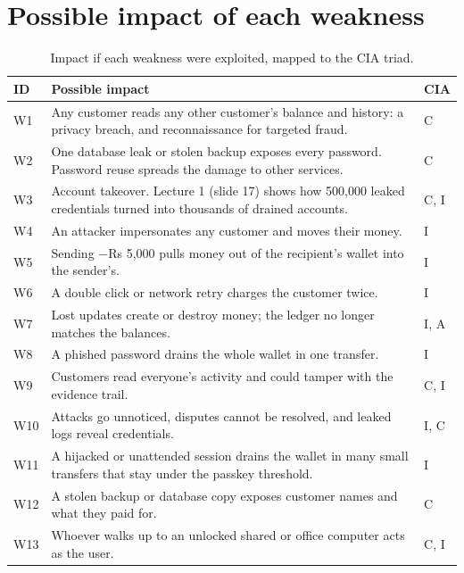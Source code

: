 \documentclass[11pt,a4paper]{article}
\begin{document}
\section{Possible impact of each weakness}

\begin{table}[H]
\centering\small
\caption{Impact if each weakness were exploited, mapped to the CIA triad.}
\begin{tabularx}{\textwidth}{lYl}
\toprule
ID & Possible impact & CIA \\
\midrule
W1 & Any customer reads any other customer's balance and history: a privacy breach, and reconnaissance for targeted fraud. & C \\
W2 & One database leak or stolen backup exposes every password. Password reuse spreads the damage to other services. & C \\
W3 & Account takeover. Lecture 1 (slide 17) shows how 500,000 leaked credentials turned into thousands of drained accounts. & C, I \\
W4 & An attacker impersonates any customer and moves their money. & I \\
W5 & Sending $-$Rs 5,000 pulls money out of the recipient's wallet into the sender's. & I \\
W6 & A double click or network retry charges the customer twice. & I \\
W7 & Lost updates create or destroy money; the ledger no longer matches the balances. & I, A \\
W8 & A phished password drains the whole wallet in one transfer. & I \\
W9 & Customers read everyone's activity and could tamper with the evidence trail. & C, I \\
W10 & Attacks go unnoticed, disputes cannot be resolved, and leaked logs reveal credentials. & I, C \\
W11 & A hijacked or unattended session drains the wallet in many small transfers that stay under the passkey threshold. & I \\
W12 & A stolen backup or database copy exposes customer names and what they paid for. & C \\
W13 & Whoever walks up to an unlocked shared or office computer acts as the user. & C, I \\
\bottomrule
\end{tabularx}
\end{table}
\end{document}
